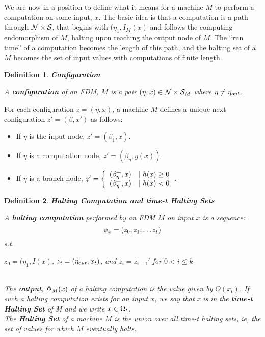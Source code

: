 \documentclass[twoside]{article}
\newtheorem{definition}{Definition}[section]
\begin{document}
We are now in a position to define what it means for a machine $M$ to
perform a computation on some input, $x$.  The basic idea is that a
computation is a path through $\mathcal{N} \times \mathcal{S}$, that begins
with $(\eta_1, I_M(x)$ and follows the computing endomorphism of $M$, halting
upon reaching the output node of $M$.  The ``run time'' of a
computation becomes the length of this path, and the halting set of a
$M$ becomes the set of input values with computations of finite
length.

\begin{definition}{\textbf{Configuration}}  

  A \textbf{configuration} of an FDM, $M$ is a pair $(\eta, x) \in
  \mathcal{N} \times \mathcal{S}_M$ where $\eta \neq \eta_{out}$.

\end{definition}

For each configuration $z = (\eta, x)$, a machine $M$ defines a unique
next configuration $z' = (\beta, x')$ as follows:

\begin{itemize}
\item If $\eta$ is the input node, $z' = (\beta_{1}, x)$.
\item If $\eta$ is a computation node, $z' = (\beta_{\eta}, g(x))$.
\item If $\eta$ is a branch node, $z' = \left\{ \begin{array}{ll} (\beta_\eta^+,
    x) & \mid h(x) \geq 0 \\ (\beta_\eta^-, x) & \mid h(x) < 0 \end{array} \right.$.
\end{itemize}

\begin{definition}{\textbf{Halting Computation and time-t Halting Sets}}

  A \textbf{halting computation} performed by an FDM $M$ on input $x$
  is a sequence: $$\phi_x = (z_0, z_1, \ldots z_t)$$ \emph{s.t.}
  \centerline{$z_0 = (\eta_1, I(x)$, $z_t = (\eta_{out}, x_t)$, and $z_i
    = z_{i-1}'$ for $0 < i \leq k$} \\

  The \textbf{output}, $\Phi_M(x)$ of a halting computation
  is the value given by $O(x_t)$.  If such a halting computation
  exists for an input $x$, we say that x is in the \textbf{time-t
    Halting Set} of M and we write $x \in \Omega_t$.  \\

  The \textbf{Halting Set} of a machine $M$ is the union over all
  time-t halting sets, ie, the set of values for which $M$ eventually
  halts.
\end{definition}
\end{document}
